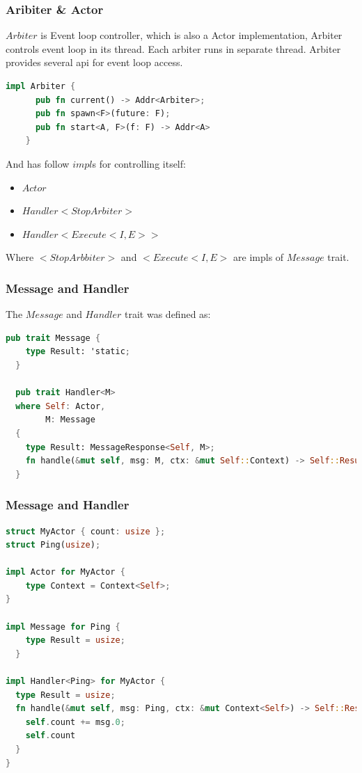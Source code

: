 \documentclass[notheorems, aspectratio=54]{beamer}
\begin{document}
\begin{frame}[fragile]
  \frametitle{Aribiter \& Actor}
  $Arbiter$ is Event loop controller, which is also a Actor implementation, Arbiter controls event loop in its thread. Each arbiter runs in separate thread. Arbiter provides several api for event loop access.

  \begin{lstlisting}[language=Rust]
    impl Arbiter {
      pub fn current() -> Addr<Arbiter>;
      pub fn spawn<F>(future: F);
      pub fn start<A, F>(f: F) -> Addr<A>
    }
  \end{lstlisting}
  And has follow $impl$s for controlling itself:
  \begin{itemize}
  \item $Actor$
  \item $Handler<StopArbiter>$
  \item $Handler<Execute<I, E>>$
  \end{itemize}
  Where $<StopArbbiter>$ and $<Execute<I, E>$ are impls of $Message$ trait.
\end{frame}


\begin{frame}[fragile]
  \frametitle{Message and Handler}
  The $Message$ and $Handler$ trait was defined as:
  \begin{lstlisting}[language=Rust]
  pub trait Message {
    type Result: 'static;
  }

  pub trait Handler<M>
  where Self: Actor,
        M: Message
  {
    type Result: MessageResponse<Self, M>;
    fn handle(&mut self, msg: M, ctx: &mut Self::Context) -> Self::Result;
  }
  \end{lstlisting}
\end{frame}

\begin{frame}[fragile]

  \frametitle{Message and Handler}
  \begin{lstlisting}[language=Rust]
struct MyActor { count: usize };
struct Ping(usize);

impl Actor for MyActor {
    type Context = Context<Self>;
}

impl Message for Ping {
    type Result = usize;
  }

impl Handler<Ping> for MyActor {
  type Result = usize;
  fn handle(&mut self, msg: Ping, ctx: &mut Context<Self>) -> Self::Result {
    self.count += msg.0;
    self.count
  }
}
  \end{lstlisting}
\end{frame}
\end{document}

